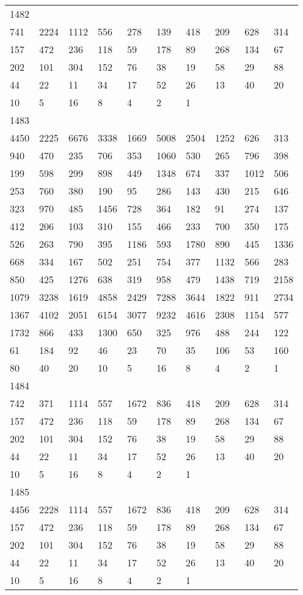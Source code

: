 \begin{longtable}{*{10}{l}}
1482&&&&&&&&&\\
741& 2224& 1112& 556& 278& 139& 418& 209& 628& 314\\
157& 472& 236& 118& 59& 178& 89& 268& 134& 67\\
202& 101& 304& 152& 76& 38& 19& 58& 29& 88\\
44& 22& 11& 34& 17& 52& 26& 13& 40& 20\\
10& 5& 16& 8& 4& 2& 1& \\

1483&&&&&&&&&\\
4450& 2225& 6676& 3338& 1669& 5008& 2504& 1252& 626& 313\\
940& 470& 235& 706& 353& 1060& 530& 265& 796& 398\\
199& 598& 299& 898& 449& 1348& 674& 337& 1012& 506\\
253& 760& 380& 190& 95& 286& 143& 430& 215& 646\\
323& 970& 485& 1456& 728& 364& 182& 91& 274& 137\\
412& 206& 103& 310& 155& 466& 233& 700& 350& 175\\
526& 263& 790& 395& 1186& 593& 1780& 890& 445& 1336\\
668& 334& 167& 502& 251& 754& 377& 1132& 566& 283\\
850& 425& 1276& 638& 319& 958& 479& 1438& 719& 2158\\
1079& 3238& 1619& 4858& 2429& 7288& 3644& 1822& 911& 2734\\
1367& 4102& 2051& 6154& 3077& 9232& 4616& 2308& 1154& 577\\
1732& 866& 433& 1300& 650& 325& 976& 488& 244& 122\\
61& 184& 92& 46& 23& 70& 35& 106& 53& 160\\
80& 40& 20& 10& 5& 16& 8& 4& 2& 1\\

1484&&&&&&&&&\\
742& 371& 1114& 557& 1672& 836& 418& 209& 628& 314\\
157& 472& 236& 118& 59& 178& 89& 268& 134& 67\\
202& 101& 304& 152& 76& 38& 19& 58& 29& 88\\
44& 22& 11& 34& 17& 52& 26& 13& 40& 20\\
10& 5& 16& 8& 4& 2& 1& \\

1485&&&&&&&&&\\
4456& 2228& 1114& 557& 1672& 836& 418& 209& 628& 314\\
157& 472& 236& 118& 59& 178& 89& 268& 134& 67\\
202& 101& 304& 152& 76& 38& 19& 58& 29& 88\\
44& 22& 11& 34& 17& 52& 26& 13& 40& 20\\
10& 5& 16& 8& 4& 2& 1& \\


\end{longtable}
